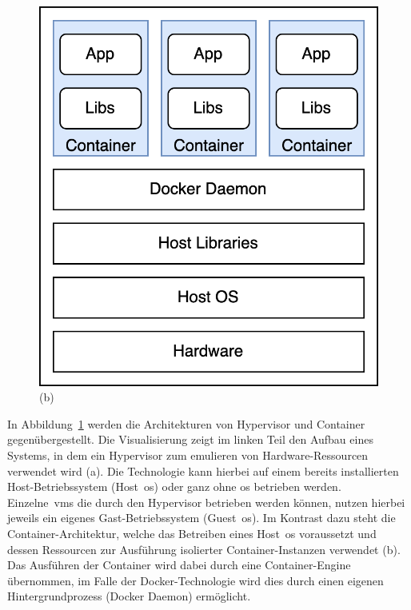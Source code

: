 \begin{figure}[H]
\begin{minipage}{0.4\textwidth}
        \includegraphics[width=\linewidth]{images/content/container-architecture}
        \captionsetup{justification=raggedright,singlelinecheck=false}%
        \vspace{-0.7cm}%
        \caption*{(b)}
    \end{minipage}
    \label{fig:vm-container-architecture}
\end{figure}

In Abbildung\ \ref{fig:vm-container-architecture} werden die Architekturen von Hypervisor und Container
gegenübergestellt.
Die Visualisierung zeigt im linken Teil den Aufbau eines Systems, in dem ein Hypervisor zum emulieren von
Hardware-Ressourcen verwendet wird (a).
Die Technologie kann hierbei auf einem bereits installierten Host-Betriebssystem (Host\ \acrshort{os}) oder ganz ohne
\acrshort{os} betrieben werden.
Einzelne\ \acrshort{vm}s die durch den Hypervisor betrieben werden können, nutzen hierbei jeweils ein eigenes
Gast-Betriebssystem (Guest\ \acrshort{os}).
Im Kontrast dazu steht die Container-Architektur, welche das Betreiben eines Host\ \acrshort{os} voraussetzt und
dessen Ressourcen zur Ausführung isolierter Container-Instanzen verwendet (b).
Das Ausführen der Container wird dabei durch eine Container-Engine übernommen, im Falle der Docker-Technologie wird
dies durch einen eigenen Hintergrundprozess (Docker Daemon) ermöglicht.

